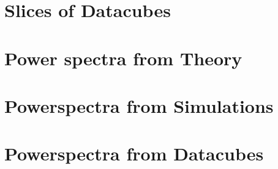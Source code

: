 %
%

\section{Slices of Datacubes}

\section{Power spectra from Theory}


\section{Powerspectra from Simulations}
\begin{figure}
    \centering
  \end{figure}

  \begin{figure}
    \centering
  \end{figure}

\section{Powerspectra from Datacubes}